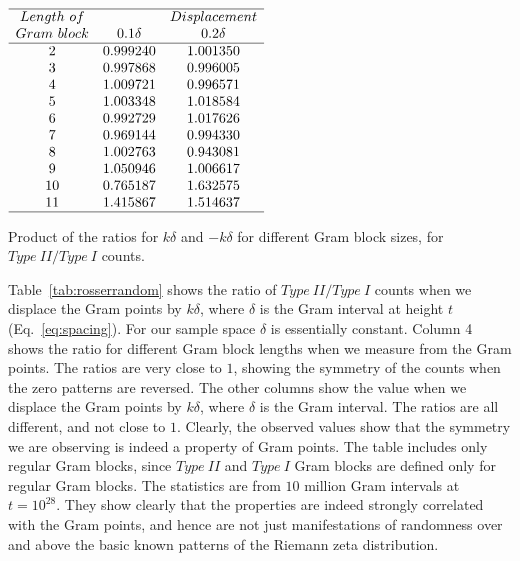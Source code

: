 \documentclass[twoside]{article}
\theoremstyle{definition}
\begin{document}
\begin{table}
\centering \(\begin{array}{ccc}
\hline
Length~of 	& &Displacement \\
Gram~block	 & 0.1\delta & 0.2\delta  \\
\hline
2 &0.999240&1.001350 \\
3 &0.997868&0.996005 \\
4 &1.009721&0.996571 \\
5 &1.003348&1.018584 \\
6 &0.992729&1.017626 \\
7 &0.969144&0.994330 \\
8 &1.002763&0.943081 \\
9 &1.050946&1.006617 \\
10 &0.765187&1.632575 \\
11 &1.415867&1.514637 \\
\hline
\end{array}\)
\caption{ {Product of the ratios for $k\delta$ and $-k\delta$ for different Gram block sizes, for $Type~II/Type~I$ counts.}}
\label{tab:rosserproduct}
\end{table}
Table~\ref{tab:rosserrandom}  shows the ratio of $Type~II/Type~I$ counts when we displace the Gram points by $k\delta$, where $\delta$ is the Gram interval at height $t$ (Eq.~\ref{eq:spacing}). For our sample space $\delta$ is essentially constant.  Column 4 shows the ratio for different Gram block lengths when we measure from the Gram points. The ratios are very close to  $1$, showing the symmetry of the counts when the zero patterns are reversed. The other columns show the value  when we displace the Gram points by $k\delta$, where $\delta$ is the Gram interval.  The ratios are all different, and not close to $1$. Clearly, the observed values show that the symmetry we are observing is indeed a property of Gram points. The table includes only regular Gram blocks, since $Type~II$ and $Type~I$ Gram blocks are defined only for regular Gram blocks.  The statistics are from $10$ million Gram intervals at $t=10^{28}$. 
They  show clearly that the properties are indeed strongly correlated with the Gram points, and hence are not just manifestations of randomness over and above the basic known patterns of the Riemann zeta distribution. 
\end{document}
